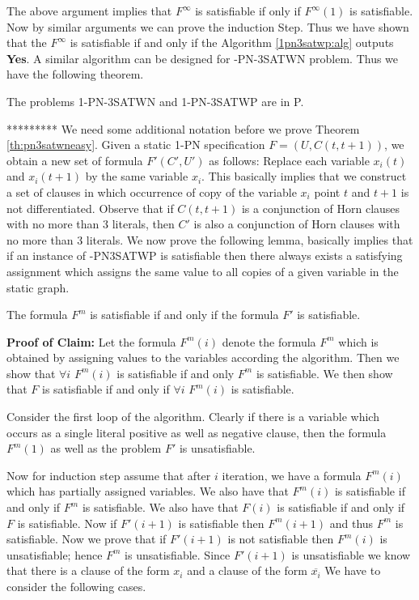 The above argument implies that $F^{\infty}$ is  satisfiable if only if
$F^{\infty}(1)$ is satisfiable. Now by similar arguments we can prove the
induction Step.
Thus we have shown that the $F^{\infty}$ is satisfiable
if and only if the Algorithm \ref{1pn3satwp:alg} outputs {\bf Yes}.
A similar algorithm can be designed for {-PN-3SATWN} problem.
Thus we have the following theorem.

\begin{theorem}\label{th:pn3satwneasy}
The problems 1-PN-3SATWN and  1-PN-3SATWP are  in P.
\end{theorem}


\iffalse**********
We need some additional notation before we prove Theorem \ref{th:pn3satwneasy}.
Given a static 1-PN specification $ F = (U, C(t,t+1))$, we obtain a new
set of formula $F'(C',U')$ as follows: 
Replace each variable $x_i(t)$ and $x_i(t+1)$
by the same variable $x_i$. This basically implies that 
we construct a set of clauses in which 
occurrence of copy of the variable $x_i$ point $t$ and $t+1$ is not
differentiated.  Observe that if $C(t, t+1)$ is a conjunction
of Horn clauses with no more than 3 literals, 
then $C'$ is also a conjunction of Horn clauses with no more than 3 literals.
We now prove the following lemma, basically implies that if an instance
of {-PN3SATWP} is satisfiable then there always exists a 
satisfying assignment which assigns the same value to all copies of a given
variable in the static graph.


\begin{claim}
The formula $F^m$ is satisfiable if and only if the formula $F'$ 
is satisfiable.
\end{claim}

\noindent
{\bf Proof of Claim:} Let the formula $F^m(i)$ denote the formula $F^m$ 
which is obtained by assigning values to the variables according the 
algorithm. Then we show that $\forall i$ $F^m(i)$ is satisfiable if and
only $F^m$ is satisfiable. We then show that $F$ is satisfiable if and
only if $\forall i$ $F^m(i)$ is satisfiable.

Consider the first loop of the algorithm. Clearly if there is a variable which
occurs as a single literal positive as well as negative clause, then the
formula $F^m(1)$ as well as the problem $F'$ is unsatisfiable.

Now for induction step assume that after $i$ iteration, we have a formula
$F^m(i)$ which has partially assigned variables. We also have that $F^m(i)$ is
satisfiable if and only if $F^m$ is satisfiable. We also have that $F(i)$ is
satisfiable if and only if $F$ is satisfiable. Now if $F'(i+1)$ is
satisfiable then $F^m(i+1)$ and thus $F^m$ is satisfiable. Now we prove that
if $F'(i+1)$ is not satisfiable then $F^m(i)$ is unsatisfiable; hence $F^m$
is unsatisfiable. Since $F'(i+1)$ is unsatisfiable we know that 
there is a clause of the form $x_i$ and a clause of the form $\overline{x_i}$  
We have to consider the following cases.

